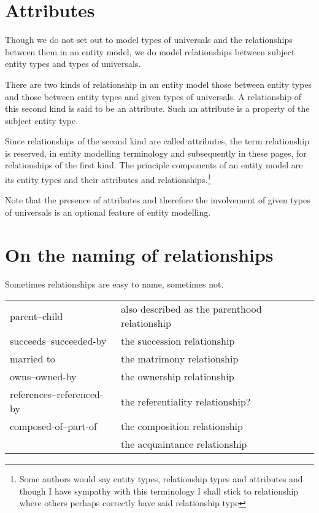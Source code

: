 \section{Attributes}
\mynote Though we do not set out to model types of universals and the relationships between them 
in an entity model, we do model relationships between subject entity types and types of universals. 

\mynote 
There are two kinds of relationship 
in an entity model those between entity types and those between 
entity types and  given types of universals. 
A relationship of this second kind is said to be an attribute. Such an attribute is a property of the subject entity type. 

\mynote Since relationships of the second kind are called attributes, the term relationship is reserved, in entity modelling terminology and subsequently in these pages, for relationships of the first kind.  The principle components of an entity model are its entity types and their attributes and relationships.\footnote{Some authors would say entity types, relationship types and attributes and though I have sympathy with this terminology I shall stick to relationship where others perhaps correctly have said relationship type}

\mynote
Note that the presence of attributes and therefore the involvement of given types of universals
is an optional feature of entity modelling. 

\section{On the naming of relationships}

\mynote Sometimes relationships are easy to name, sometimes not. 

\begin{center}
\begin{tabular} {| l | p{9cm} |}
\hline
parent--child & also described as the parenthood relationship\\
succeeds--succeeded-by &  the succession relationship \\
married to             &  the matrimony relationship \\
owns--owned-by         & the ownership relationship\\
references--referenced-by & the referentiality relationship?\\
composed-of--part-of   &  the composition relationship\\
                       &  the acquaintance relationship\\
\hline
\end{tabular} 
\end{center}

